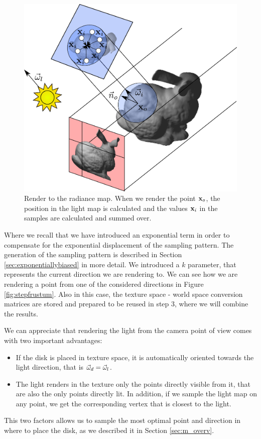 \begin{figure}[!ht]
\centering
\includegraphics[width=0.9 \linewidth]{images/method/step2_improved.pdf}
\caption{Render to the radiance map. When we render the point $\mathbf{x}_o$, the position in the light map is calculated and the values $\mathbf{x}_i$ in the samples are calculated and summed over.}
\label{fig:step2}
\end{figure} 

Where we recall that we have introduced an exponential term in order to compensate for the exponential displacement of the sampling pattern. The generation of the sampling pattern is described in Section \ref{sec:exponentiallybiased} in more detail. We introduced a $k$ parameter, that represents the current direction we are rendering to. We can see how we are rendering a point from one of the considered directions in Figure \ref{fig:stepfrustum}. Also in this case, the texture space - world space conversion matrices are stored and prepared to be reused in step 3, where we will combine the results. 

We can appreciate that rendering the light from the camera point of view comes with two important advantages:
\begin{itemize}
\item If the disk is placed in texture space, it is automatically oriented towards the light direction, that is $\vec{\omega}_d = \vec{\omega}_l$.
\item The light renders in the texture only the points directly visible from it, that are also the only points directly lit. In addition, if we sample the light map on any point, we get the corresponding vertex that is closest to the light.
\end{itemize}
This two factors allows us to sample the most optimal point and direction in where to place the disk, as we described it in Section \ref{sec:m_overv}.
 
